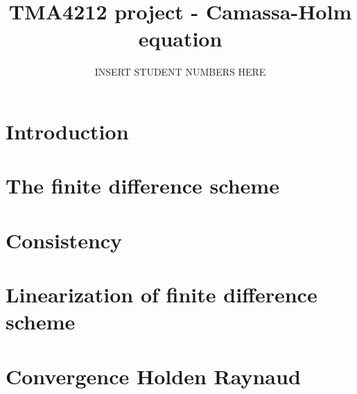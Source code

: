 \documentclass{article}
\title{TMA4212 project - Camassa-Holm equation}
\author{INSERT STUDENT NUMBERS HERE}
\begin{document}
\maketitle

\newpage

\section*{Introduction}


\newpage

\section*{The finite difference scheme}


\newpage

\section*{Consistency}


\newpage


\section*{Linearization of finite difference scheme}


\newpage

\section*{Convergence Holden Raynaud}

\end{document}

